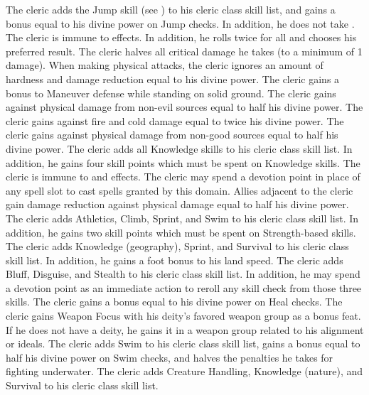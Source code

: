 The cleric adds the Jump skill (see ) to his cleric class skill list, and gains a bonus equal to his divine power on Jump checks.
In addition, he does not take .
The cleric is immune to  effects.
In addition, he rolls twice for all  and chooses his preferred result.
The cleric halves all critical damage he takes (to a minimum of 1 damage).
When making physical attacks, the cleric ignores an amount of hardness and damage reduction equal to his divine power.
The cleric gains a  bonus to Maneuver defense while standing on solid ground.
The cleric gains  against physical damage from non-evil sources equal to half his divine power.
The cleric gains  against fire and cold damage equal to twice his divine power.
The cleric gains  against physical damage from non-good sources equal to half his divine power.
The cleric adds all Knowledge skills to his cleric class skill list.
In addition, he gains four skill points which must be spent on Knowledge skills.
The cleric is immune to  and  effects.
The cleric may spend a devotion point in place of any spell slot to cast spells granted by this domain.
Allies adjacent to the cleric gain damage reduction against physical damage equal to half his divine power.
The cleric adds Athletics, Climb, Sprint, and Swim to his cleric class skill list.
In addition, he gains two skill points which must be spent on Strength-based skills.
The cleric adds Knowledge (geography), Sprint, and Survival to his cleric class skill list.
In addition, he gains a  foot bonus to his land speed.
The cleric adds Bluff, Disguise, and Stealth to his cleric class skill list.
In addition, he may spend a devotion point as an immediate action to reroll any skill check from those three skills.
The cleric gains a bonus equal to his divine power on Heal checks.
The cleric gains Weapon Focus with his deity's favored weapon group as a bonus feat.
If he does not have a deity, he gains it in a weapon group related to his alignment or ideals.
The cleric adds Swim to his cleric class skill list, gains a bonus equal to half his divine power on Swim checks, and halves the penalties he takes for fighting underwater.
The cleric adds Creature Handling, Knowledge (nature), and Survival to his cleric class skill list.


